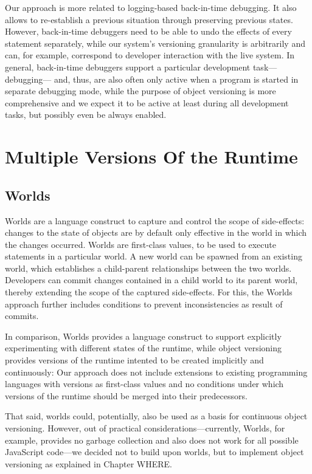 Our approach is more related to logging-based back-in-time debugging.
It also allows to re-establish a previous situation through preserving previous states.
However, back-in-time debuggers need to be able to undo the effects of every statement separately, while our system's versioning granularity is arbitrarily and can, for example, correspond to developer interaction with the live system.
In general, back-in-time debuggers support a particular development task---debugging--- and, thus, are also often only active when a program is started in separate debugging mode, while the purpose of object versioning is more comprehensive and we expect it to be active at least during all development tasks, but possibly even be always enabled.


\section{Multiple Versions Of the Runtime}


\subsection{Worlds}

Worlds are a language construct to capture and control the scope of side-effects: changes to the state of objects are by default only effective in the world in which the changes occurred.
Worlds are first-class values, to be used to execute statements in a particular world.
A new world can be spawned from an existing world, which establishes a child-parent relationships between the two worlds.
Developers can commit changes contained in a child world to its parent world, thereby extending the scope of the captured side-effects.
For this, the Worlds approach further includes conditions to prevent inconsistencies as result of commits.

In comparison, Worlds provides a language construct to support explicitly experimenting with different states of the runtime, while object versioning provides versions of the runtime intented to be created implicitly and continuously: Our approach does not include extensions to existing programming languages with versions as first-class values and no conditions under which versions of the runtime should be merged into their predecessors.

That said, worlds could, potentially, also be used as a basis for continuous object versioning.
However, out of practical considerations---currently, Worlds, for example, provides no garbage collection and also does not work for all possible JavaScript code---we decided not to build upon worlds, but to implement object versioning as explained in Chapter WHERE. 


